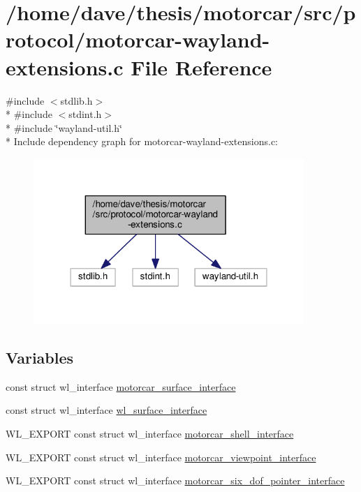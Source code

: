 \hypertarget{motorcar-wayland-extensions_8c}{\section{/home/dave/thesis/motorcar/src/protocol/motorcar-\/wayland-\/extensions.c File Reference}
\label{motorcar-wayland-extensions_8c}
}
{\ttfamily \#include $<$stdlib.\-h$>$}\\*
{\ttfamily \#include $<$stdint.\-h$>$}\\*
{\ttfamily \#include \char`\"{}wayland-\/util.\-h\char`\"{}}\\*
Include dependency graph for motorcar-\/wayland-\/extensions.c\-:
\nopagebreak
\begin{figure}[H]
\begin{center}
\leavevmode
\includegraphics[width=290pt]{motorcar-wayland-extensions_8c__incl}
\end{center}
\end{figure}
\subsection*{Variables}
\begin{DoxyCompactItemize}
\item 
const struct wl\-\_\-interface \hyperlink{motorcar-wayland-extensions_8c_a56acb8594d0103b3705453e8ea77915b}{motorcar\-\_\-surface\-\_\-interface}
\item 
const struct wl\-\_\-interface \hyperlink{motorcar-wayland-extensions_8c_ab5b94bcc25b21d2fdd945533016d0e33}{wl\-\_\-surface\-\_\-interface}
\item 
W\-L\-\_\-\-E\-X\-P\-O\-R\-T const struct wl\-\_\-interface \hyperlink{motorcar-wayland-extensions_8c_af93f16d847b10210463edbe6017b9517}{motorcar\-\_\-shell\-\_\-interface}
\item 
W\-L\-\_\-\-E\-X\-P\-O\-R\-T const struct wl\-\_\-interface \hyperlink{motorcar-wayland-extensions_8c_a75e24dc8eb5259b6e2ec9ac54c4a201b}{motorcar\-\_\-viewpoint\-\_\-interface}
\item 
W\-L\-\_\-\-E\-X\-P\-O\-R\-T const struct wl\-\_\-interface \hyperlink{motorcar-wayland-extensions_8c_a8218cfd9e117b255a79a328e88f0b741}{motorcar\-\_\-six\-\_\-dof\-\_\-pointer\-\_\-interface}
\end{DoxyCompactItemize}


